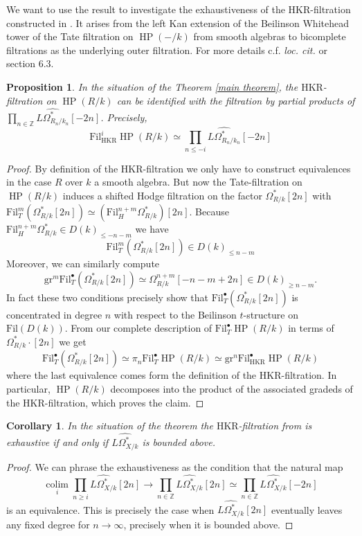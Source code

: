 \documentclass[10pt, reqno]{amsart}
\newtheorem{proposition}[theorem]{Proposition}
\newtheorem{corollary}[theorem]{Corollary}
\theoremstyle{definition}
\theoremstyle{remark}
\newcommand{\Z}{\mathbb{Z}}
\newcommand{\dr}[3]{\Omega^{#3}_{#1/#2}}
\DeclareMathOperator{\colim}{\mathrm{colim}}
\newcommand{\colimarg}[1]{\underset{#1}{\colim}}
\newcommand{\Fil}{\mathrm{Fil}}
\newcommand{\gr}{\mathrm{gr}}
\newcommand{\HKR}{\mathrm{HKR}}
\DeclareMathOperator{\HP}{\mathrm{HP}}
\begin{document}
We want to use the result to investigate the exhaustiveness of the $\HKR$-filtration constructed in \cite{Ant19}. It arises from the left Kan extension of the Beilinson Whitehead tower of the Tate filtration on $\HP(-/k)$ from smooth algebras to bicomplete filtrations as the underlying outer filtration. For more details c.f. \textit{loc. cit.} or \cite{BL22} section 6.3. 

\begin{proposition}\label{comparison}
	In the situation of the Theorem \ref{main theorem}, the $\HKR$-filtration on $\HP(R/k)$ can be identified with the filtration by partial products of $\prod_{n\in \Z}\widehat{L\dr {R_n}{k_n}*}[-2n]$. Precisely, \[\Fil^i_{\HKR}\HP(R/k)\simeq\prod_{n\leq -i}\widehat{L\dr {R_n}{k_n}*}[-2n]\]
\end{proposition}
\begin{proof}
	By definition of the $\HKR$-filtration we only have to construct equivalences in the case $R$ over $k$ a smooth algebra. 
	But now the Tate-filtration on $\HP(R/k)$ induces a shifted Hodge filtration on the factor $\dr Rk*[2n]$ with $\Fil^m_T(\dr Rk*[2n])\simeq (\Fil_H^{n+m}\dr Rk*)[2n]$. Because $\Fil_H^{n+m}\dr Rk*\in D(k)_{\leq -n-m}$ we have
	\[\Fil^{m}_T(\dr Rk*[2n])\in D(k)_{\leq n-m}\]
	Moreover, we can similarly compute
	\[\gr^m\Fil_T^\bullet(\dr Rk*[2n])\simeq \dr Rk{n+m}[-n-m+2n]\in D(k)_{\geq n-m}
	.
	\]
	In fact these two conditions precisely show that $\Fil_T^\bullet(\dr Rk*[2n])$ is concentrated in degree $n$ with respect to the Beilinson $t$-structure on $\Fil(D(k))$. From our complete description of $\Fil_T^\bullet\HP(R/k)$ in terms of $\dr Rk*\cdot [2n]$ we get
	\[\Fil_T^\bullet(\dr Rk*[2n])\simeq\pi_n\Fil_T^\bullet\HP(R/k)\simeq\gr^n\Fil_\HKR^\bullet\HP(R/k)\]
	where the last equivalence comes form the definition of the $\HKR$-filtration. In particular, $\HP(R/k)$ decomposes into the product of the associated gradeds of the $\HKR$-filtration, which proves the claim.
\end{proof}

\begin{corollary}
	In the situation of the theorem the $\HKR$-filtration from \cite{Ant19} is exhaustive if and only if $\widehat{L\dr Xk*}$ is bounded above.
\end{corollary}
\begin{proof}
	We can phrase the exhaustiveness as the condition that the natural map
	\[\colimarg i\prod_{n\geq i}\widehat{L\dr Xk*}[2n]\to \prod_{n\in\Z}\widehat{L\dr Xk*}[2n]\simeq\prod_{n\in\Z}\widehat{L\dr Xk*}[-2n]\]
	is an equivalence. This is precisely the case when $\widehat{L\dr Xk*}[2n]$ eventually leaves any fixed degree for $n\to\infty$, precisely when it is bounded above.
\end{proof}
\end{document}
